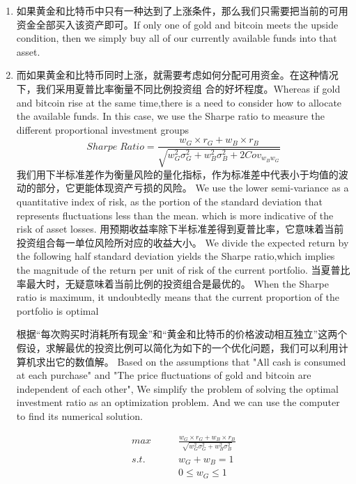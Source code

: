 \documentclass{mcmthesis}
\begin{document}
\begin{enumerate}
  \item 如果黄金和比特币中只有一种达到了上涨条件，那么我们只需要把当前的可用资金全部买入该资产即可。If only one of gold and bitcoin meets the upside condition, then we simply buy all of our currently available funds into that asset.
  \item 而如果黄金和比特币同时上涨，就需要考虑如何分配可用资金。在这种情况下，我们采用夏普比率衡量不同比例投资组
  合的好坏程度。Whereas if gold and bitcoin rise at the same time,there is a need to consider how to allocate the available funds. 
  In this case, we use the Sharpe ratio to measure the different proportional investment groups
$$ Sharpe \; Ratio=\frac{w_G\times r_G+w_B\times r_B}{\sqrt{w_G^2 \sigma _G^2 + w_B^2 \sigma _B^2+2Cov_{w_B w_G}}}$$
  我们用下半标准差作为衡量风险的量化指标，作为标准差中代表小于均值的波动的部分，它更能体现资产亏损的风险。
We use the lower semi-variance as a quantitative index of risk, as the portion of the standard deviation that represents fluctuations less than the mean.
which is more indicative of the risk of asset losses.
  用预期收益率除下半标准差得到夏普比率，它意味着当前投资组合每一单位风险所对应的收益大小。
We divide the expected return by the following half standard deviation yields the Sharpe ratio,which implies the magnitude of the return per unit of risk of the current portfolio.
  当夏普比率最大时，无疑意味着当前比例的投资组合是最优的。
When the Sharpe ratio is maximum, it undoubtedly means that the current proportion of the portfolio is optimal

  根据“每次购买时消耗所有现金”和“黄金和比特币的价格波动相互独立”这两个假设，求解最优的投资比例可以简化为如下的一个优化问题，我们可以利用计算机求出它的数值解。
Based on the assumptions that "All cash is consumed at each purchase" and "The price fluctuations of gold and bitcoin are independent of each other", 
We simplify the problem of solving the optimal investment ratio as an optimization problem.
And we can use the computer to find its numerical solution.

\begin{align*}
  max \qquad & \frac{w_G\times r_G+w_B\times r_B}{\sqrt{w_G^2 \sigma _G^2 + w_B^2 \sigma _B^2}}\\
  s.t. \quad & w_G+w_B=1\\
  & 0 \le w_G \le 1 \\
\end{align*}
\end{enumerate}
\end{document}
